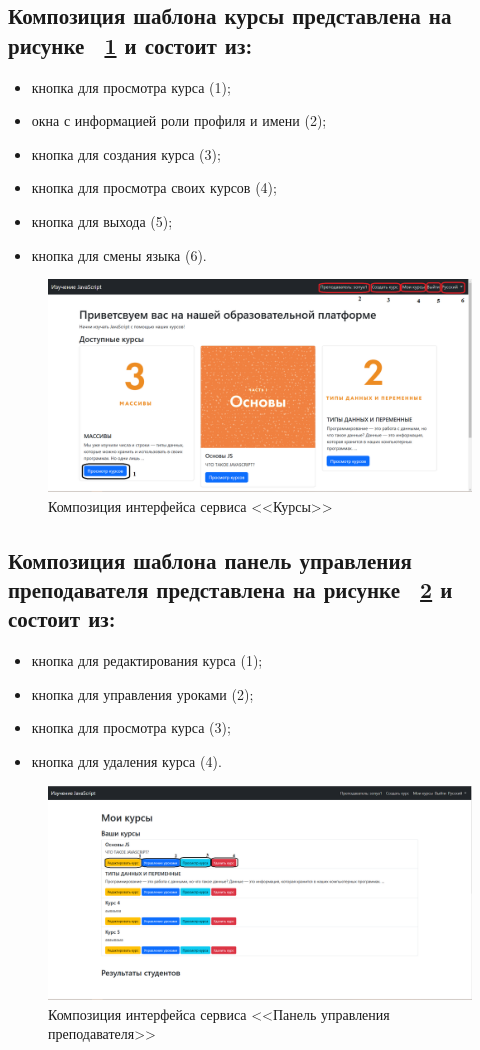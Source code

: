 \subsection*{Композиция шаблона курсы представлена на рисунке ~\ref{templ:image1} и состоит из:}

\begin{itemize}
	\item кнопка для просмотра курса (1);
	\item окна с информацией роли профиля и имени (2);
	\item кнопка для создания курса (3);
	\item кнопка для просмотра своих курсов (4);
	\item кнопка для выхода (5);
	\item кнопка для смены языка (6).
\end{itemize}

\begin{figure}[htp!]
	\centering
	\includegraphics[width=0.7\linewidth]{images/курсы}
	\caption{Композиция интерфейса сервиса <<Курсы>>}
	\label{templ:image1}
\end{figure}

\subsection*{Композиция шаблона панель управления преподавателя представлена на рисунке ~\ref{templ:image2} и состоит из:}

\begin{itemize}
	\item кнопка для редактирования курса (1);
	\item кнопка для управления уроками (2);
	\item кнопка для просмотра курса (3);
	\item кнопка для удаления курса (4).
\end{itemize}

\begin{figure}[htp!]
	\centering
	\includegraphics[width=0.7\linewidth]{images/учитель}
	\caption{Композиция интерфейса сервиса <<Панель управления преподавателя>>}
	\label{templ:image2}
\end{figure}
\newpage 
